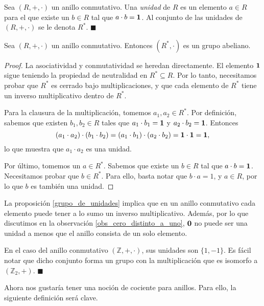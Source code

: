 \begin{definition}[Unidades] \label{grupo de unidades}
Sea $(R, +, \cdot)$ un anillo conmutativo. Una \emph{unidad} de $R$ es un elemento $a \in R$ para el que existe un $b \in R$ tal que $a \cdot b = \mathbf{1}$. Al conjunto de las unidades de $(R, +, \cdot)$ se le  denota $R^\ast$.
\hfill$\blacksquare$

\begin{proposition} \label{grupo_de_unidades}
Sea $(R, +, \cdot)$ un anillo conmutativo. Entonces $(R^\ast, \cdot)$ es un grupo abeliano.
\end{proposition}

\begin{proof}
La asociatividad y conmutatividad se heredan directamente. El elemento $\mathbf{1}$ sigue teniendo la propiedad de neutralidad en $R^\ast \subseteq R$. Por lo tanto, necesitamos probar que $R^\ast$ es cerrado bajo multiplicaciones, y que cada elemento de $R^\ast$ tiene un inverso multiplicativo dentro de $R^\ast$.

Para la clausura de la multiplicación, tomemos $a_1, a_2 \in R^\ast$. Por definición, sabemos que existen $b_1, b_2 \in R$ tales que $a_1 \cdot b_1 = \mathbf{1}$ y $a_2 \cdot b_2 = \mathbf{1}$. Entonces 
$$(a_1 \cdot a_2) \cdot (b_1 \cdot b_2) = (a_1 \cdot b_1) \cdot (a_2 \cdot b_2) = \mathbf{1} \cdot \mathbf{1} = \mathbf{1},$$
lo que muestra que $a_1 \cdot a_2$ es una unidad.

Por último, tomemos un $a \in R^\ast$. Sabemos que existe un $b \in R$ tal que $a \cdot b = \mathbf{1}$. Necesitamos probar que $b \in R^\ast$. Para ello, basta notar que $b \cdot a = 1$, y $a \in R$, por lo que $b$ es también una unidad.
\end{proof}

La proposición \ref{grupo_de_unidades} implica que en un anillo conmutativo cada elemento puede tener a lo sumo un inverso multiplicativo. Además, por lo que discutimos en la observación \ref{obs_cero_distinto_a_uno}, $\mathbf{0}$ no puede ser una unidad a menos que el anillo consista de un solo elemento.

\end{definition}

\begin{example} 
En el caso del anillo conmutativo $(\mathbb{Z}, +, \cdot)$, sus unidades son $\{1, -1\}$. Es fácil notar que dicho conjunto forma un grupo con la multiplicación que es isomorfo a $(\mathbb{Z}_2, +)$. \hfill$\blacksquare$
\end{example}

Ahora nos gustaría tener una noción de cociente para anillos. Para ello, la siguiente definición será clave.

